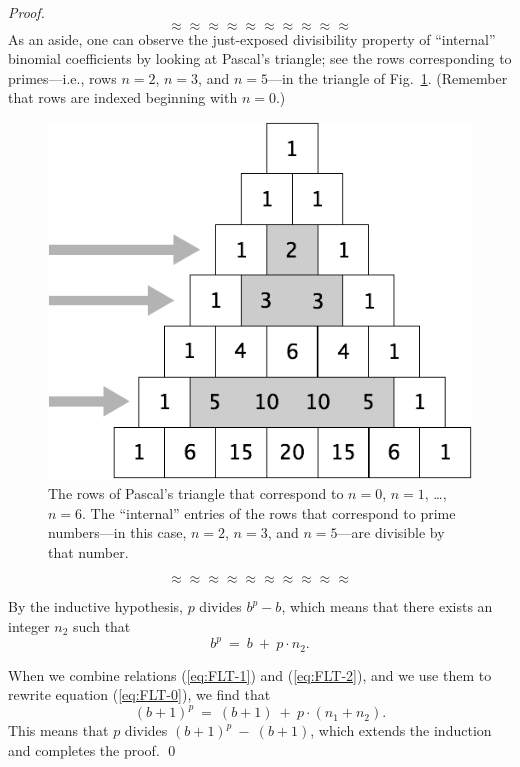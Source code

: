 \begin{proof}
\[ \approx \approx \approx \approx \approx \approx \approx \approx \approx \approx \]
As an aside, one can observe the just-exposed divisibility property of
``internal'' binomial coefficients by looking at Pascal's triangle;
see the rows corresponding to primes---i.e., rows $n=2$, $n=3$, and
$n=5$---in the triangle of Fig.~\ref{fig:TrianglePrime}.  (Remember
that rows are indexed beginning with $n=0$.)
\begin{figure}[ht]
\begin{center}
  \includegraphics[scale=0.3]{FiguresArithmetic/TrianglePascalPrimes.png}
\caption{The rows of Pascal's triangle that correspond to $n=0$,
  $n=1$, \ldots, $n=6$.  The ``internal'' entries of the rows that
  correspond to prime numbers---in this case, $n=2$, $n=3$, and $n=5$---are
  divisible by that number.}
\label{fig:TrianglePrime}
\end{center}
\end{figure}
\[ \approx \approx \approx \approx \approx \approx \approx \approx \approx \approx \]

By the inductive hypothesis, $p$ divides $b^p -b$, which means that
there exists an integer $n_2$ such that
\begin{equation}
\label{eq:FLT-2}
 b^p \ = \ b \ + \ p \cdot n_2.
\end{equation}

\smallskip

When we combine relations (\ref{eq:FLT-1}) and (\ref{eq:FLT-2}), and
we use them to rewrite equation (\ref{eq:FLT-0}), we find that
\[
(b+1)^p \ = \ (b + 1) \ + \ p \cdot (n_1 + n_2).
\]
This means that $p$ divides $(b+1)^p \ - \ (b + 1)$, which extends the
induction and completes the proof.
\qed
\end{proof}

